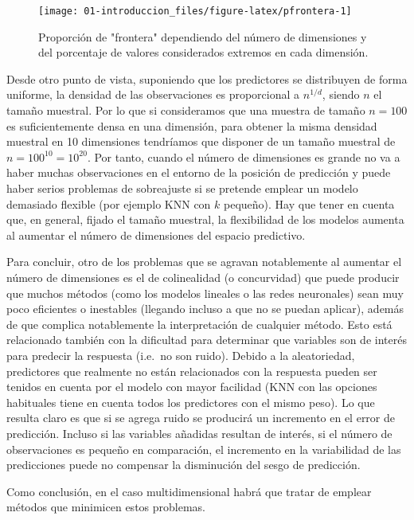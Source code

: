 \documentclass[
]{book}
\theoremstyle{break}
\theoremstyle{definition}
\theoremstyle{definition}
\theoremstyle{definition}
\theoremstyle{definition}
\theoremstyle{remark}
\begin{document}
\begin{figure}[!htb]

{\centering \texttt{[image: 01-introduccion\_files/figure-latex/pfrontera-1]} 

}

\caption{Proporción de "frontera" dependiendo del número de dimensiones y del porcentaje de valores considerados extremos en cada dimensión.}\label{fig:pfrontera}
\end{figure}

Desde otro punto de vista, suponiendo que los predictores se distribuyen de forma uniforme, la densidad de las observaciones es proporcional a \(n^{1/d}\), siendo \(n\) el tamaño muestral.
Por lo que si consideramos que una muestra de tamaño \(n=100\) es suficientemente densa en una dimensión, para obtener la misma densidad muestral en 10 dimensiones tendríamos que disponer de un tamaño muestral de \(n = 100^{10} = 10^{20}\).
Por tanto, cuando el número de dimensiones es grande no va a haber muchas observaciones en el entorno de la posición de predicción y puede haber serios problemas de sobreajuste si se pretende emplear un modelo demasiado flexible (por ejemplo KNN con \(k\) pequeño). Hay que tener en cuenta que, en general, fijado el tamaño muestral, la flexibilidad de los modelos aumenta al aumentar el número de dimensiones del espacio predictivo.

Para concluir, otro de los problemas que se agravan notablemente al aumentar el número de dimensiones es el de colinealidad (o concurvidad) que puede producir que muchos métodos (como los modelos lineales o las redes neuronales) sean muy poco eficientes o inestables (llegando incluso a que no se puedan aplicar), además de que complica notablemente la interpretación de cualquier método.
Esto está relacionado también con la dificultad para determinar que variables son de interés para predecir la respuesta (i.e.~no son ruido).
Debido a la aleatoriedad, predictores que realmente no están relacionados con la respuesta pueden ser tenidos en cuenta por el modelo con mayor facilidad (KNN con las opciones habituales tiene en cuenta todos los predictores con el mismo peso).
Lo que resulta claro es que si se agrega ruido se producirá un incremento en el error de predicción.
Incluso si las variables añadidas resultan de interés, si el número de observaciones es pequeño en comparación, el incremento en la variabilidad de las predicciones puede no compensar la disminución del sesgo de predicción.

Como conclusión, en el caso multidimensional habrá que tratar de emplear métodos que minimicen estos problemas.
\end{document}
